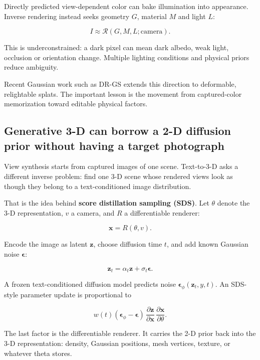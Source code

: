 Directly predicted view-dependent color can bake illumination into appearance. Inverse rendering instead seeks geometry \(G\), material \(M\) and light \(L\):

\[
I\approx\mathcal R(G,M,L;\text{camera}).
\]

This is underconstrained: a dark pixel can mean dark albedo, weak light, occlusion or orientation change. Multiple lighting conditions and physical priors reduce ambiguity.

Recent Gaussian work such as DR-GS extends this direction to deformable, relightable splats. The important lesson is the movement from captured-color memorization toward editable physical factors.

\subsection{Generative 3-D can borrow a 2-D diffusion prior without having a target photograph}\label{04-visual-computing-ii-ch035-generative-3-d-can-borrow-a-2-d-diffusion-prior-without-having-a-target-photograph}

\hypertarget{04-visual-computing-ii-ch035-generative-3-d-can-borrow-a-2-d-diffusion-prior-without-having-a-target-photograph}{}

View synthesis starts from captured images of one scene. Text-to-3-D asks a different inverse problem: find one 3-D scene whose rendered views look as though they belong to a text-conditioned image distribution.

That is the idea behind \textbf{score distillation sampling (SDS)}. Let \(\theta\) denote the 3-D representation, \(v\) a camera, and \(R\) a differentiable renderer:

\[\mathbf x=R(\theta,v).\]

Encode the image as latent \(\mathbf z\), choose diffusion time \(t\), and add known Gaussian noise \(\boldsymbol\epsilon\):

\[\mathbf z_t=\alpha_t\mathbf z+\sigma_t\boldsymbol\epsilon.\]

A frozen text-conditioned diffusion model predicts noise \(\boldsymbol\epsilon_\phi(\mathbf z_t,y,t)\). An SDS-style parameter update is proportional to

\[w(t)(\boldsymbol\epsilon_\phi-\boldsymbol\epsilon)\,\frac{\partial\mathbf z}{\partial\mathbf x}\,\frac{\partial\mathbf x}{\partial\theta}.\]

The last factor is the differentiable renderer. It carries the 2-D prior back into the 3-D representation: density, Gaussian positions, mesh vertices, texture, or whatever theta stores.

